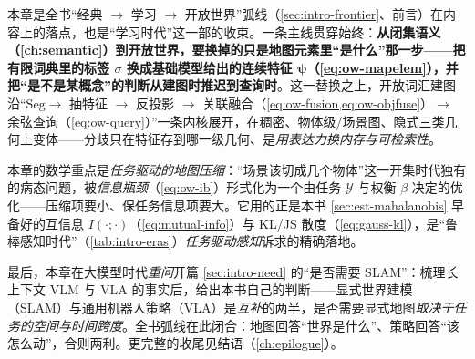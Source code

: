 本章是全书“经典 $\to$ 学习 $\to$ 开放世界”弧线（\cref{sec:intro-frontier}、前言）在内容上的落点，也是“学习时代”这一部的收束。一条主线贯穿始终：\textbf{从闭集语义（\cref{ch:semantic}）到开放世界，要换掉的只是地图元素里“是什么”那一步——把有限词典里的标签 $\sigma$ 换成基础模型给出的连续特征 $\boldsymbol\psi$（\cref{eq:ow-mapelem}），并把“是不是某概念”的判断从建图时推迟到查询时}。这一替换之上，开放词汇建图沿“$\mathrm{Seg}\to$ 抽特征 $\to$ 反投影 $\to$ 关联融合（\cref{eq:ow-fusion,eq:ow-objfuse}）$\to$ 余弦查询（\cref{eq:ow-query}）”一条内核展开，在稠密、物体级/场景图、隐式三类几何上变体——分歧只在特征存到哪一级几何、是\emph{用表达力换内存与可检索性}。

本章的数学重点是\emph{任务驱动的地图压缩}：“场景该切成几个物体”这一开集时代独有的病态问题，被\emph{信息瓶颈}（\cref{eq:ow-ib}）形式化为一个由任务 $\mathcal{Y}$ 与权衡 $\beta$ 决定的优化——压缩项要小、保任务信息项要大。它用的正是本书 \cref{sec:est-mahalanobis} 早备好的互信息 $I(\cdot;\cdot)$（\cref{eq:mutual-info}）与 KL/JS 散度（\cref{eq:gauss-kl}），是“鲁棒感知时代”（\cref{tab:intro-eras}）\emph{任务驱动感知}诉求的精确落地。

最后，本章在大模型时代\emph{重问}开篇 \cref{sec:intro-need} 的“是否需要 SLAM”：梳理长上下文 VLM 与 VLA 的事实后，给出本书自己的判断——显式世界建模（SLAM）与通用机器人策略（VLA）是\emph{互补}的两半，是否需要显式地图\emph{取决于任务的空间与时间跨度}。全书弧线在此闭合：地图回答“世界是什么”、策略回答“该怎么动”，合则两利。更完整的收尾见结语（\cref{ch:epilogue}）。

